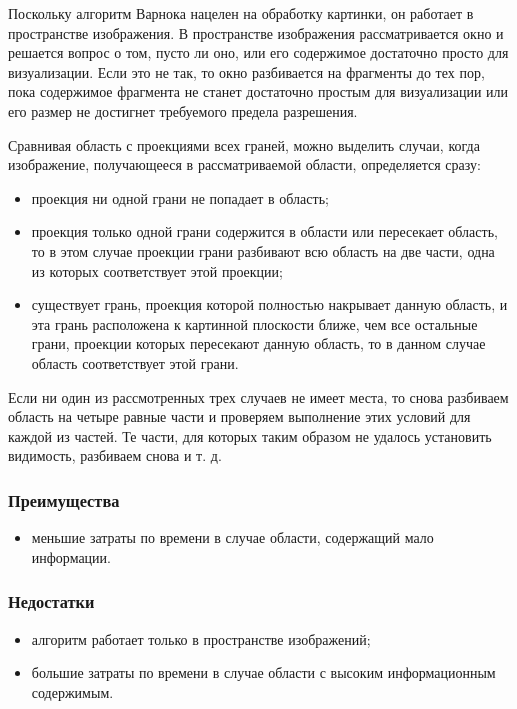  Поскольку алгоритм Варнока нацелен на обработку картинки, он работает в пространстве изображения. В пространстве изображения рассматривается окно и решается вопрос о том, пусто ли оно, или его содержимое достаточно просто для визуализации. Если это не так, то окно разбивается на фрагменты до тех пор, пока содержимое фрагмента не станет достаточно простым для визуализации или его размер не достигнет требуемого предела разрешения.
 
 Сравнивая область с проекциями всех граней, можно выделить случаи, когда изображение, получающееся в рассматриваемой области, определяется сразу:
 
\begin{itemize}
 \item	проекция ни одной грани не попадает в область;
\item	проекция только одной грани содержится в области или пересекает область, то в этом случае проекции грани разбивают всю область на две части, одна из которых соответствует этой проекции;
\item	существует грань, проекция которой полностью накрывает данную область, и эта грань расположена к картинной плоскости ближе, чем все остальные грани, проекции которых пересекают данную область, то в данном случае область соответствует этой грани.
\end{itemize}
 
 Если ни один из рассмотренных трех случаев не имеет места, то снова разбиваем область на четыре равные части и проверяем выполнение этих условий для каждой из частей. Те части, для которых таким образом не удалось установить видимость, разбиваем снова и т. д.
 
\subsubsection*{Преимущества}
\begin{itemize}
\item	меньшие затраты по времени в случае области, содержащий мало информации.
\end{itemize}


\subsubsection*{Недостатки}
 \begin{itemize}
\item	алгоритм работает только в пространстве изображений;
\item	большие затраты по времени в случае области с высоким информационным содержимым.
\end{itemize}

